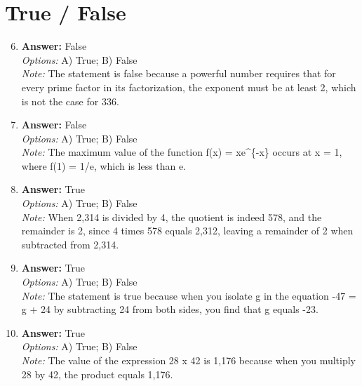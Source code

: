 \documentclass[12pt]{article}
\begin{document}
\section*{True / False}
\begin{enumerate}[label=\arabic*.]
\setcounter{enumi}{5}
\item \textbf{Answer:} False
\\ \textit{Options:} A) True; B) False
\\ \textit{Note:} The statement is false because a powerful number requires that for every prime factor in its factorization, the exponent must be at least 2, which is not the case for 336.
\item \textbf{Answer:} False
\\ \textit{Options:} A) True; B) False
\\ \textit{Note:} The maximum value of the function f(x) = xe^\{-x\} occurs at x = 1, where f(1) = 1/e, which is less than e.
\item \textbf{Answer:} True
\\ \textit{Options:} A) True; B) False
\\ \textit{Note:} When 2,314 is divided by 4, the quotient is indeed 578, and the remainder is 2, since 4 times 578 equals 2,312, leaving a remainder of 2 when subtracted from 2,314.
\item \textbf{Answer:} True
\\ \textit{Options:} A) True; B) False
\\ \textit{Note:} The statement is true because when you isolate g in the equation -47 = g + 24 by subtracting 24 from both sides, you find that g equals -23.
\item \textbf{Answer:} True
\\ \textit{Options:} A) True; B) False
\\ \textit{Note:} The value of the expression 28 x 42 is 1,176 because when you multiply 28 by 42, the product equals 1,176.
\end{enumerate}
\end{document}
